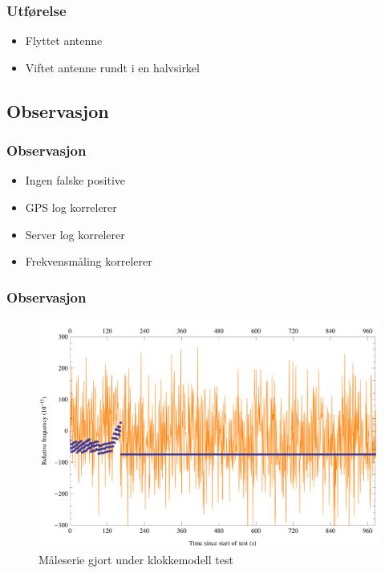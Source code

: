 \documentclass[xcolor=table]{beamer}
\begin{document}
\begin{frame}
\frametitle{Utførelse}
      \begin{itemize}
            \setlength\itemsep{2em}
        \item Flyttet antenne 
        \item Viftet antenne rundt i en halvsirkel
      \end{itemize}
\end{frame}

\begin{frame}
\subsection{Observasjon}
\frametitle{Observasjon}
      \begin{itemize}
            \setlength\itemsep{2em}
        \item Ingen falske positive
        \item GPS log korrelerer
        \item Server log korrelerer
        \item Frekvensmåling korrelerer
      \end{itemize}
\end{frame}

\begin{frame}
\frametitle{Observasjon}
      \begin{figure}
        \includegraphics[scale=0.70]{thesis/graphics/20161024-test2-telemetry-and-cnt91-combined-1-2.png}
        \caption{Måleserie gjort under klokkemodell test}
      \end{figure}
\end{frame}
\end{document}
